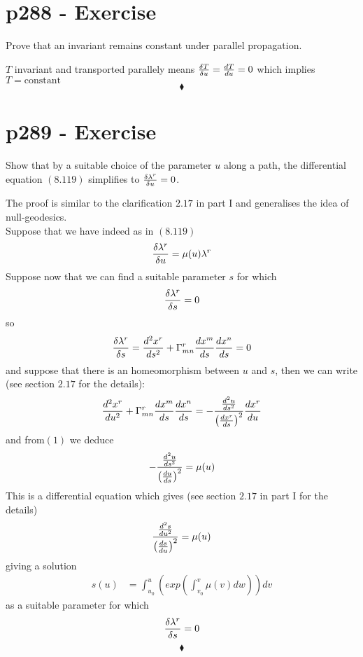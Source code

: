\section{p288 - Exercise}
\begin{tcolorbox}
Prove that an invariant remains constant under parallel propagation.
\end{tcolorbox}
 $T$ invariant and transported parallely means $\fdv{T}{u}=\dv{T}{u}=0$ which implies $T=\text{constant}$
$$\blacklozenge$$
\newpage

\section{p289 - Exercise}
\begin{tcolorbox}
Show that by a suitable choice of the parameter $u$ along a path, the differential equation $\mathbf{(8.119)}$ simplifies to $\fdv{\lambda^r}{u}=0$.
\end{tcolorbox}
 The proof is similar to the clarification $2.17$ in part I and generalises the idea of null-geodesics.\\
 Suppose that we have indeed as in $\mathbf{(8.119)}$
 \begin{align}
 \fdv{\lambda^r}{u} = \mu(u)\lambda^r
 \end{align}
 Suppose now that we can find a suitable parameter $s$ for which
 \begin{align}
 \fdv{\lambda^r}{s} = 0
 \end{align}
 so 
 \begin{align}
 \fdv{\lambda^r}{s} = \dv[2]{x^r}{s}+\Gamma^r_{mn}\dv{x^m}{s}\dv{x^n}{s}=0
 \end{align}
 and suppose that there is an homeomorphism between $u$ and $s$, then we can write (see section $2.17$ for the details):
 \begin{align}
\dv[2]{x^r}{u}+\Gamma^r_{mn}\dv{x^m}{s}\dv{x^n}{s}=- \frac{\dv[2]{u}{s}}{\left(\dv{x^r}{s}\right)^2}\dv{x^r}{u}
 \end{align}
 and from$(1)$ we deduce 
 \begin{align}
 -\frac{\dv[2]{u}{s}}{\left(\dv{u}{s}\right)^2}= \mu(u)
 \end{align}
 This is a differential equation which gives (see section $2.17$ in part I for the details)
 \begin{align}
 \frac{\dv[2]{s}{u}}{\left(\dv{s}{u}\right)^2}= \mu(u)
 \end{align}
 giving a solution 
 \begin{align}
 s(u)&= \int_{u_0}^{u}\left(exp\left(\int_{v_0}^v\mu(v)dw\right)\right)dv
 \end{align}
 as a suitable parameter for which $$\fdv{\lambda^r}{s} = 0$$
$$\blacklozenge$$
\newpage



